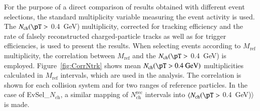 \documentclass[cernpreprint,texlive=2014,txfonts,UKenglish]{latex/atlasdoc}
\begin{document}
For the purpose of a direct comparison of results obtained with different event selections, the standard multiplicity variable measuring the event activity is used. The $N_{\mathrm{ch}} (\pT >$ 0.4~GeV)  multiplicity, corrected for tracking efficiency and the rate of falsely reconstructed charged-particle tracks as well as for trigger efficiencies, is used to present the results. When selecting events according to $M_{\mathrm{ref}}$ multiplicity, the correlation  between $M_{\mathrm{ref}}$ and the $N_{\mathrm{ch}} (\pT >$ 0.4~GeV) is employed. Figure~\ref{fig:CorrNtrk} shows mean $N_{\mathrm{ch}} (\pT > 0.4~\mathrm{GeV})$ multiplicities calculated in $M_{\mathrm{ref}}$ intervals, which are used in the analysis. The correlation is shown for each collision system and for two \pT ranges of reference particles. In the case of EvSel\_$N_{\mathrm{ch}}$, a similar mapping of  $N_{\mathrm{ch}}^{\mathrm{rec}}$ intervals into $\langle N_{\mathrm{ch}} (\pT >$ 0.4~GeV)$\rangle$ is made. 
\end{document}
